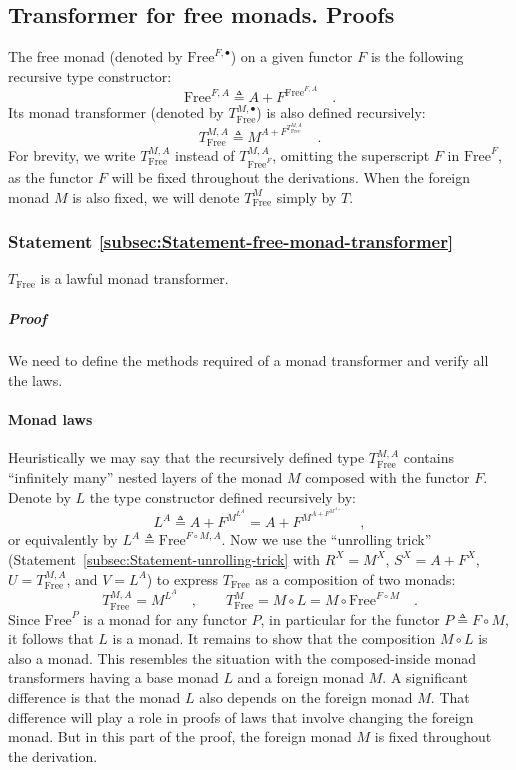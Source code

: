 \subsection{Transformer for free monads. Proofs}

The free monad (denoted by $\text{Free}^{F,\bullet}$) on a given
functor $F$ is the following recursive type constructor:
\[
\text{Free}^{F,A}\triangleq A+F^{\text{Free}^{F,A}}\quad.
\]
Its monad transformer (denoted by $T_{\text{Free}}^{M,\bullet}$)
is also defined recursively:
\[
T_{\text{Free}}^{M,A}\triangleq M^{A+F^{T_{\text{Free}}^{M,A}}}\quad.
\]
For brevity, we write $T_{\text{Free}}^{M,A}$ instead of $T_{\text{Free}^{F}}^{M,A}$,
omitting the superscript $F$ in $\text{Free}^{F}$, as the functor
$F$ will be fixed throughout the derivations. When the foreign monad
$M$ is also fixed, we will denote $T_{\text{Free}}^{M}$ simply by
$T$.

\subsubsection{Statement \label{subsec:Statement-free-monad-transformer}\ref{subsec:Statement-free-monad-transformer}}

$T_{\text{Free}}$ is a lawful monad transformer.

\subparagraph{Proof}

We need to define the methods required of a monad transformer and
verify all the laws. 

\paragraph{Monad laws}

Heuristically we may say that the recursively defined type $T_{\text{Free}}^{M,A}$
contains \textsf{``}infinitely many\textsf{''} nested layers of the monad $M$ composed
with the functor $F$. Denote by $L$ the type constructor defined
recursively by:
\[
L^{A}\triangleq A+F^{M^{L^{A}}}=A+F^{M^{A+F^{M^{A+...}}}}\quad,
\]
or equivalently by $L^{A}\triangleq\text{Free}^{F\circ M,A}$. Now
we use the \textsf{``}unrolling trick\textsf{''}
(Statement~\ref{subsec:Statement-unrolling-trick} with $R^{X}=M^{X}$,
$S^{X}=A+F^{X}$, $U=T_{\text{Free}}^{M,A}$, and $V=L^{A}$) to express
$T_{\text{Free}}$ as a composition of two monads:
\[
T_{\text{Free}}^{M,A}=M^{L^{A}}\quad,\quad\quad T_{\text{Free}}^{M}=M\circ L=M\circ\text{Free}^{F\circ M}\quad.
\]
Since $\text{Free}^{P}$ is a monad for any functor $P$, in particular
for the functor $P\triangleq F\circ M$, it follows that $L$ is a
monad. It remains to show that the composition $M\circ L$ is also
a monad. This resembles the situation with the composed-inside monad
transformers having a base monad $L$ and a foreign monad $M$. A
significant difference is that the monad $L$ also depends on the
foreign monad $M$. That difference will play a role in proofs of
laws that involve changing the foreign monad. But in this part of
the proof, the foreign monad $M$ is fixed throughout the derivation. 


